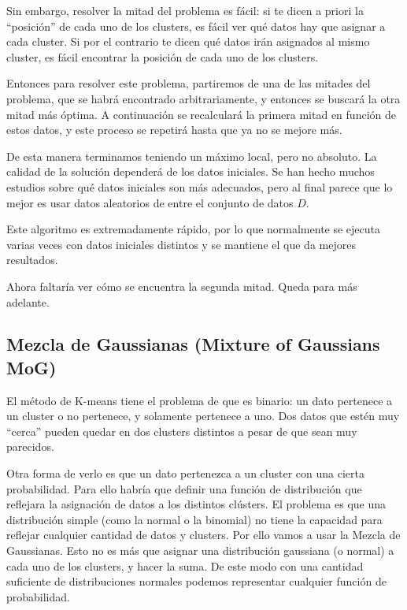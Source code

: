 Sin embargo, resolver la mitad del problema es fácil: si te dicen a priori la ``posición'' de cada uno de los clusters, es fácil ver qué datos hay que asignar a cada cluster. Si por el contrario te dicen qué datos irán asignados al mismo cluster, es fácil encontrar la posición de cada uno de los clusters.

Entonces para resolver este problema, partiremos de una de las mitades del problema, que se habrá encontrado arbitrariamente, y entonces se buscará la otra mitad más óptima. A continuación se recalculará la primera mitad en función de estos datos, y este proceso se repetirá hasta que ya no se mejore más.

De esta manera terminamos teniendo un máximo local, pero no absoluto. La calidad de la solución dependerá de los datos iniciales. Se han hecho muchos estudios sobre qué datos iniciales son más adecuados, pero al final parece que lo mejor es usar datos aleatorios de entre el conjunto de datos $D$.

Este algoritmo es extremadamente rápido, por lo que normalmente se ejecuta varias veces con datos iniciales distintos y se mantiene el que da mejores resultados.


Ahora faltaría ver cómo se encuentra la segunda mitad. Queda para más adelante.

\subsection{Mezcla de Gaussianas (Mixture of Gaussians MoG)}

El método de K-means tiene el problema de que es binario: un dato pertenece a un cluster o no pertenece, y solamente pertenece a uno. Dos datos que estén muy ``cerca'' pueden quedar en dos clusters distintos a pesar de que sean muy parecidos.

Otra forma de verlo es que un dato pertenezca a un cluster con una cierta probabilidad. Para ello habría que definir una función de distribución que reflejara la asignación de datos a los distintos clústers. El problema es que una distribución simple (como la normal o la binomial) no tiene la capacidad para reflejar cualquier cantidad de datos y clusters. Por ello vamos a usar la Mezcla de Gaussianas. Esto no es más que asignar una distribución gaussiana (o normal) a cada uno de los clusters, y hacer la suma. De este modo con una cantidad suficiente de distribuciones normales podemos representar cualquier función de probabilidad.


